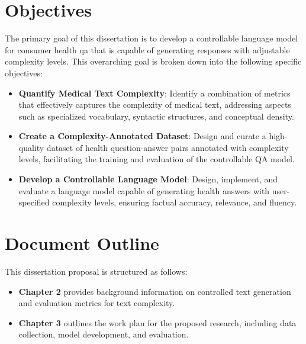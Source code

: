 \section{Objectives}

The primary goal of this dissertation is to develop a controllable language model for consumer health \gls{qa} that is capable of generating responses with adjustable complexity levels. This overarching goal is broken down into the following specific objectives:

\begin{itemize}
\item \textbf{Quantify Medical Text Complexity}: Identify a combination of metrics that effectively captures the complexity of medical text, addressing aspects such as specialized vocabulary, syntactic structures, and conceptual density.
\item \textbf{Create a Complexity-Annotated Dataset}: Design and curate a high-quality dataset of health question-answer pairs annotated with complexity levels, facilitating the training and evaluation of the controllable QA model.
\item \textbf{Develop a Controllable Language Model}: Design, implement, and evaluate a language model capable of generating health answers with user-specified complexity levels, ensuring factual accuracy, relevance, and fluency.
\end{itemize}

\section{Document Outline}

This dissertation proposal is structured as follows:


\begin{itemize}
\item \textbf{Chapter 2} provides background information on controlled text generation and evaluation metrics for text complexity.
\item \textbf{Chapter 3} outlines the work plan for the proposed research, including data collection, model development, and evaluation.
\end{itemize}